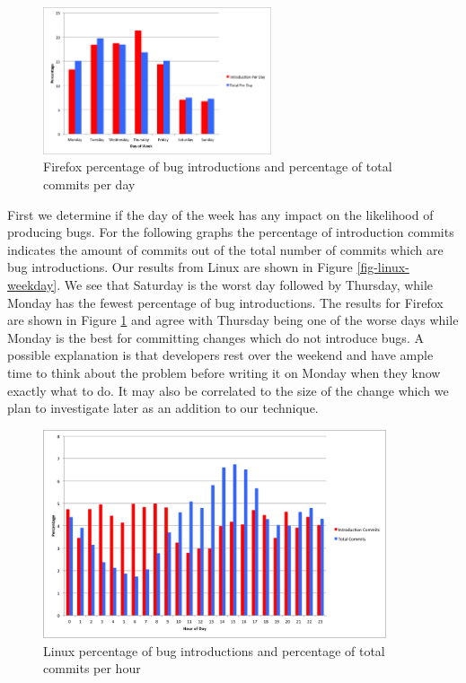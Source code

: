 \begin{figure}
\begin{center}
\includegraphics[width=0.6\textwidth]{firefox_bug_introduction_day_of_week.png}
\end{center}
\caption{Firefox percentage of bug introductions and percentage of total commits per day}
\label{fig-firefox-weekday}
\end{figure}

First we determine if the day of the week has any impact on the
likelihood of producing bugs. For the following graphs the percentage
of introduction commits indicates the amount of commits out of the
total number of commits which are bug introductions. Our results from
Linux are shown in Figure \ref{fig-linux-weekday}. We see that
Saturday is the worst day followed by Thursday, while Monday has the
fewest percentage of bug introductions. The results for Firefox are
shown in Figure \ref{fig-firefox-weekday} and agree with Thursday
being one of the worse days while Monday is the best for committing
changes which do not introduce bugs. A possible explanation is that
developers rest over the weekend and have ample time to think about
the problem before writing it on Monday when they know exactly what to
do. It may also be correlated to the size of the change which we plan
to investigate later as an addition to our technique.

\begin{figure}
\begin{center}
\includegraphics[width=0.9\textwidth]{linux_hour_of_day.png}
\end{center}
\caption{Linux percentage of bug introductions and percentage of total commits per hour}
\label{fig-linux-hour}
\end{figure}

